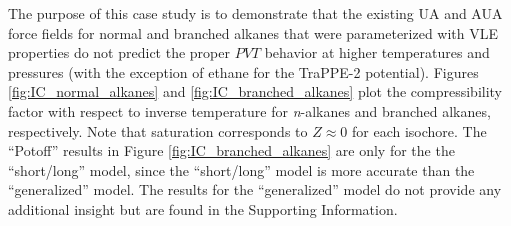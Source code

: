 \documentclass[journal=jctc,manuscript=article]{achemso}
\begin{document}
The purpose of this case study is to demonstrate that the existing UA and AUA force fields for normal and branched alkanes that were parameterized with VLE properties do not predict the proper $PVT$ behavior at higher temperatures and pressures (with the exception of ethane for the TraPPE-2 potential). Figures \ref{fig:IC_normal_alkanes} and \ref{fig:IC_branched_alkanes} plot the compressibility factor with respect to inverse temperature for \textit{n}-alkanes and branched alkanes, respectively. Note that saturation corresponds to $Z \approx 0$ for each isochore. The ``Potoff'' results in Figure \ref{fig:IC_branched_alkanes} are only for the the ``short/long'' model, since the ``short/long'' model is more accurate than the ``generalized'' model. The results for the ``generalized'' model do not provide any additional insight but are found in the Supporting Information. 


\end{document}
